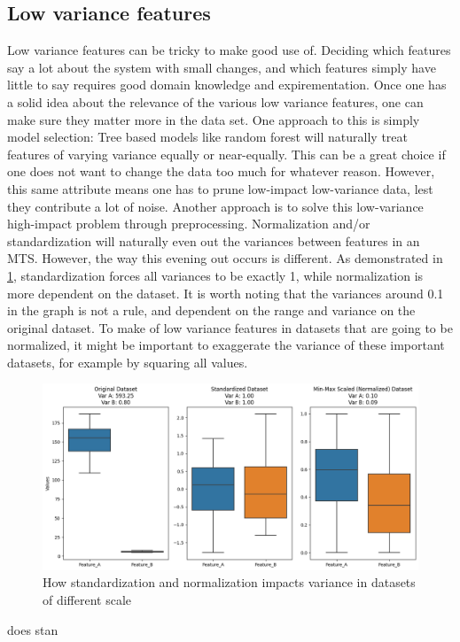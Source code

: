 \subsection{Low variance features}
Low variance features can be tricky to make good use of. Deciding which features say a lot about the system with small changes, and which features simply have little to say requires good domain knowledge and expirementation.
Once one has a solid idea about the relevance of the various low variance features, one can make sure they matter more in the data set.
One approach to this is simply model selection: Tree based models like random forest will naturally treat features of varying variance equally or near-equally. This can be a great choice if one does not want to change the data too much for whatever reason. However, this same attribute means one has to prune low-impact low-variance data, lest they contribute a lot of noise.
Another approach is to solve this low-variance high-impact problem through preprocessing. 
Normalization and/or standardization will naturally even out the variances between features in an MTS.
However, the way this evening out occurs is different. As demonstrated in \ref*{variance impact}, standardization forces all variances to be exactly 1, while normalization is more dependent on the dataset. It is worth noting that the variances around 0.1 in the graph is not a rule, and dependent on the range and variance on the original dataset.
To make of low variance features in datasets that are going to be normalized, it might be important to exaggerate the variance of these important datasets, for example by squaring all values.


\begin{figure}[ht]
\centering
\includegraphics[width=\columnwidth]{Figures/Graphs/variance_normalization_stardization.png}
\caption{How standardization and normalization impacts variance in datasets of different scale}
\label{variance impact}
\end{figure}does stan

